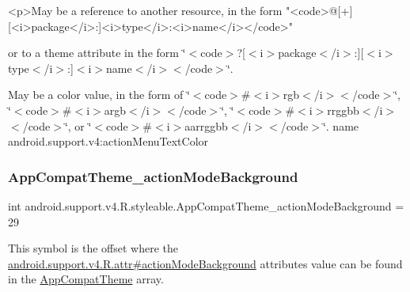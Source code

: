\begin{DoxyVerb}      <p>May be a reference to another resource, in the form "<code>@[+][<i>package</i>:]<i>type</i>:<i>name</i></code>"
\end{DoxyVerb}
 or to a theme attribute in the form \char`\"{}$<$code$>$?\mbox{[}$<$i$>$package$<$/i$>$\+:\mbox{]}\mbox{[}$<$i$>$type$<$/i$>$\+:\mbox{]}$<$i$>$name$<$/i$>$$<$/code$>$\char`\"{}. 

May be a color value, in the form of \char`\"{}$<$code$>$\#$<$i$>$rgb$<$/i$>$$<$/code$>$\char`\"{}, \char`\"{}$<$code$>$\#$<$i$>$argb$<$/i$>$$<$/code$>$\char`\"{}, \char`\"{}$<$code$>$\#$<$i$>$rrggbb$<$/i$>$$<$/code$>$\char`\"{}, or \char`\"{}$<$code$>$\#$<$i$>$aarrggbb$<$/i$>$$<$/code$>$\char`\"{}.  name android.\+support.\+v4\+:action\+Menu\+Text\+Color \mbox{\label{classandroid_1_1support_1_1v4_1_1R_1_1styleable_afefcbfb79f6f036571910bdb524294fe}} 
\subsubsection{\texorpdfstring{App\+Compat\+Theme\+\_\+action\+Mode\+Background}{AppCompatTheme\_actionModeBackground}}
{\footnotesize\ttfamily int android.\+support.\+v4.\+R.\+styleable.\+App\+Compat\+Theme\+\_\+action\+Mode\+Background = 29\hspace{0.3cm}{\ttfamily [static]}}

This symbol is the offset where the \hyperlink{classandroid_1_1support_1_1v4_1_1R_1_1attr_ac4c7f5acc692e04adae25d9567546265}{android.\+support.\+v4.\+R.\+attr\#action\+Mode\+Background} attribute\textquotesingle{}s value can be found in the \hyperlink{classandroid_1_1support_1_1v4_1_1R_1_1styleable_ac07ebbe62ed977f6dcaadc6397840ace}{App\+Compat\+Theme} array.

